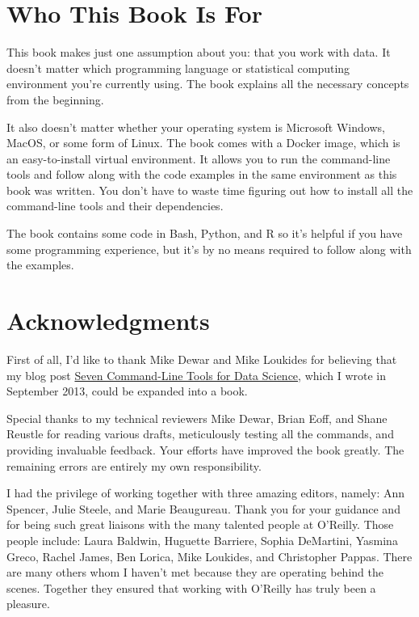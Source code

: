 \documentclass[
]{book}
\theoremstyle{definition}
\theoremstyle{definition}
\theoremstyle{definition}
\theoremstyle{remark}
\begin{document}
\hypertarget{who-this-book-is-for}{%
\section*{Who This Book Is For}\label{who-this-book-is-for}}

This book makes just one assumption about you: that you work with data. It doesn't matter which programming language or statistical computing environment you're currently using. The book explains all the necessary concepts from the beginning.

It also doesn't matter whether your operating system is Microsoft Windows, MacOS, or some form of Linux. The book comes with a Docker image, which is an easy-to-install virtual environment. It allows you to run the command-line tools and follow along with the code examples in the same environment as this book was written. You don't have to waste time figuring out how to install all the command-line tools and their dependencies.

The book contains some code in Bash, Python, and R so it's helpful if you have some programming experience, but it's by no means required to follow along with the examples.

\hypertarget{acknowledgments}{%
\section*{Acknowledgments}\label{acknowledgments}}

First of all, I'd like to thank Mike Dewar and Mike Loukides for believing that my blog post \href{http://jeroenjanssens.com/2013/09/19/seven-command-line-tools-for-data-science.html}{Seven Command-Line Tools for Data Science}, which I wrote in September 2013, could be expanded into a book.

Special thanks to my technical reviewers Mike Dewar, Brian Eoff, and Shane Reustle for reading various drafts, meticulously testing all the commands, and providing invaluable feedback. Your efforts have improved the book greatly. The remaining errors are entirely my own responsibility.

I had the privilege of working together with three amazing editors, namely: Ann Spencer, Julie Steele, and Marie Beaugureau. Thank you for your guidance and for being such great liaisons with the many talented people at O'Reilly. Those people include: Laura Baldwin, Huguette Barriere, Sophia DeMartini, Yasmina Greco, Rachel James, Ben Lorica, Mike Loukides, and Christopher Pappas. There are many others whom I haven't met because they are operating behind the scenes. Together they ensured that working with O'Reilly has truly been a pleasure.
\end{document}
